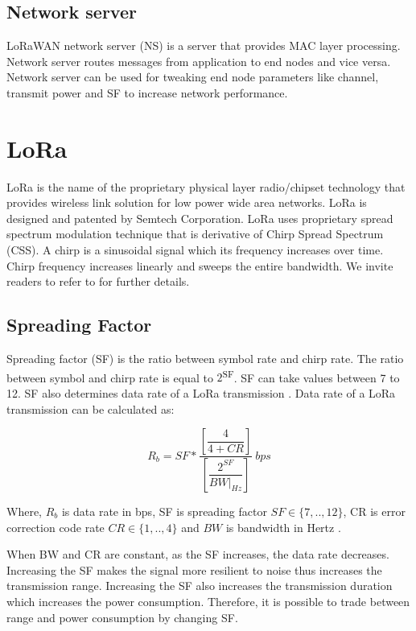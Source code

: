 \documentclass[conference]{IEEEtran}
\begin{document}
\subsection{Network server}
\par LoRaWAN network server (NS) is a server that provides MAC layer processing. Network server routes messages from application to end nodes and vice versa. Network server can be used for tweaking end node parameters like channel, transmit power and SF to increase network performance.


\section{LoRa}
\par LoRa is the name of the proprietary physical layer radio/chipset technology that provides wireless link solution for low power wide area networks. LoRa is designed and patented by Semtech Corporation. LoRa uses proprietary spread spectrum modulation technique that is derivative of Chirp Spread Spectrum (CSS). A chirp is a sinusoidal signal which its frequency increases over time. Chirp frequency increases linearly and sweeps the entire bandwidth. We invite readers to refer to \cite{AN1200.22} for further details.

\subsection{Spreading Factor}
\par Spreading factor (SF) is the ratio between symbol rate and chirp rate. The ratio between symbol and chirp rate is equal to $2$\textsuperscript{SF}. SF can take values between 7 to 12. SF also determines data rate of a LoRa transmission \cite{AN1200.22}. Data rate of a LoRa transmission can be calculated as:

\begin{equation} \label{eq:bit_rate_sf}
R_{b} = SF * \dfrac{\left[ \dfrac{4}{4+CR} \right] }{ \left[ \dfrac{2^{SF}}{BW|_{Hz}} \right]} \ bps
\end{equation}

Where, $R_{b}$ is data rate in bps, SF is spreading factor $SF \in \{7,..,12\}$, CR is error correction code rate $CR \in \{1,..,4\}$ and $BW$ is bandwidth in Hertz \cite{AN1200.22}.

\par When BW and CR are constant, as the SF increases, the data rate decreases. Increasing the SF makes the signal more resilient to noise thus increases the transmission range. Increasing the SF also increases the transmission duration which increases the power consumption. Therefore, it is possible to trade between range and power consumption by changing SF.
\end{document}
